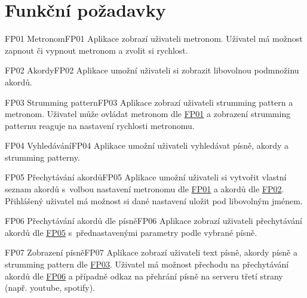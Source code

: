 \section{Funkční požadavky}
\label{sc:functional_req}

\begin{requirment}{FP01 Metronom}{FP01}
    Aplikace zobrazí uživateli metronom. Uživatel má možnost zapnout či vypnout metronom a zvolit si rychlost.
\end{requirment}

\begin{requirment}{FP02 Akordy}{FP02}
    Aplikace umožní uživateli si zobrazit libovolnou podmnožinu akordů.
\end{requirment}

\begin{requirment}{FP03 Strumming pattern}{FP03}
    Aplikace zobrazí uživateli strumming pattern a metronom. Uživatel může ovládat metronom dle \hyperref[FP01]{FP01} a zobrazení strumming patternu reaguje na nastavení rychlosti metronomu.
\end{requirment}

\begin{requirment}{FP04 Vyhledávání}{FP04}
    Aplikace umožní uživateli vyhledávat písně, akordy a strumming patterny.
\end{requirment}

\begin{requirment}{FP05 Přechytávání akordů}{FP05}
    Aplikace umožní uživateli si vytvořit vlastní seznam akordů s~volbou nastavení metronomu dle \hyperref[FP01]{FP01} a akordů dle \hyperref[FP02]{FP02}.
    Přihlášený uživatel má možnost si dané nastavení uložit pod libovolným jménem.
\end{requirment}

\begin{requirment}{FP06 Přechytávání akordů dle písně}{FP06}
    Aplikace zobrazí uživateli přechytávání akordů dle \hyperref[FP05]{FP05} s~přednastavenými parametry podle vybrané písně.
\end{requirment}

\begin{requirment}{FP07 Zobrazení písně}{FP07}
    Aplikace zobrazí uživateli text písně, akordy písně a strumming pattern dle \hyperref[FP03]{FP03}. Uživatel má možnost přechodu na přechytávání akordů dle \hyperref[FP06]{FP06} a případně odkaz na přehrání písně na serveru třetí strany (např. youtube, spotify).
\end{requirment}

